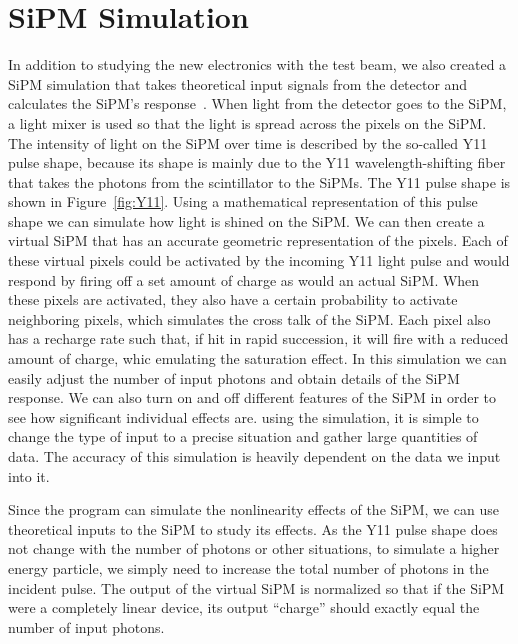 \section{SiPM Simulation}

In addition to studying the new electronics with the test beam, we also created a SiPM simulation that takes theoretical input signals from the detector and calculates the SiPM's response~\cite{SiPMSimulation_github}. When light from the detector goes to the SiPM, a light mixer is used so that the light is spread across the pixels on the SiPM. The intensity of light on the SiPM over time is described by the so-called Y11 pulse shape, because its shape is mainly due to the Y11 wavelength-shifting fiber that takes the photons from the scintillator to the SiPMs. The Y11 pulse shape is shown in Figure~\ref{fig:Y11}. Using a mathematical representation of this pulse shape we can simulate how light is shined on the SiPM. We can then create a virtual SiPM that has an accurate geometric representation of the pixels. Each of these virtual pixels could be activated by the incoming Y11 light pulse and would respond by firing off a set amount of charge as would an actual SiPM. When these pixels are activated, they also have a certain probability to activate neighboring pixels, which simulates the cross talk of the SiPM. Each pixel also has a recharge rate such that, if hit in rapid succession, it will fire with a reduced amount of charge, whic emulating the saturation effect. In this simulation we can easily adjust the number of input photons and obtain details of the SiPM response. We can also turn on and off different features of the SiPM in order to see how significant individual effects are. using the simulation, it is simple to change the type of input to a precise situation and gather large quantities of data. The accuracy of this simulation is heavily dependent on the data we input into it.

Since the program can simulate the nonlinearity effects of the SiPM, we can use theoretical inputs to the SiPM to study its effects. As the Y11 pulse shape does not change with the number of photons or other situations, to simulate a higher energy particle, we simply need to increase the total number of photons in the incident pulse. The output of the virtual SiPM is normalized so that if the SiPM were a completely linear device, its output ``charge'' should exactly equal the number of input photons. 

